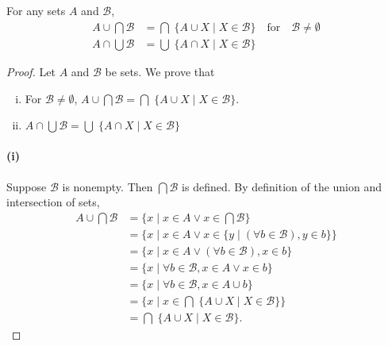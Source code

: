 \documentclass{report}
\begin{document}
\subsection{}%
\label{sub:general-distributive-laws}

For any sets $A$ and $\mathscr{B}$,
  \begin{align*}
    A \cup \bigcap \mathscr{B} & =
      \bigcap\; \{ A \cup X \mid X \in \mathscr{B} \}
        \quad\text{for}\quad \mathscr{B} \neq \emptyset \\
    A \cap \bigcup \mathscr{B} & =
      \bigcup\; \{ A \cap X \mid X \in \mathscr{B} \}
  \end{align*}

\begin{proof}

  Let $A$ and $\mathscr{B}$ be sets.
  We prove that
    \begin{enumerate}[(i)]
      \item For $\mathscr{B} \neq \emptyset$,
        $A \cup \bigcap \mathscr{B} =
         \bigcap\; \{ A \cup X \mid X \in \mathscr{B} \}$.
      \item $A \cap \bigcup \mathscr{B} =
             \bigcup\; \{ A \cap X \mid X \in \mathscr{B} \}$
    \end{enumerate}

  \paragraph{(i)}%

    Suppose $\mathscr{B}$ is nonempty.
    Then $\bigcap \mathscr{B}$ is defined.
    By definition of the union and intersection of sets,
      \begin{align*}
        A \cup \bigcap \mathscr{B}
          & = \{ x \mid x \in A \lor x \in \bigcap \mathscr{B} \} \\
          & = \{ x \mid x \in A \lor
            x \in \{ y \mid (\forall b \in \mathscr{B}), y \in b \}\} \\
          & = \{ x \mid x \in A \lor (\forall b \in \mathscr{B}), x \in b \} \\
          & = \{ x \mid \forall b \in \mathscr{B}, x \in A \lor x \in b \} \\
          & = \{ x \mid \forall b \in \mathscr{B}, x \in A \cup b \} \\
          & = \{ x \mid
            x \in \bigcap\; \{ A \cup X \mid X \in \mathscr{B} \}\} \\
          & = \bigcap\; \{ A \cup X \mid X \in \mathscr{B} \}.
      \end{align*}


\end{proof}
\end{document}

